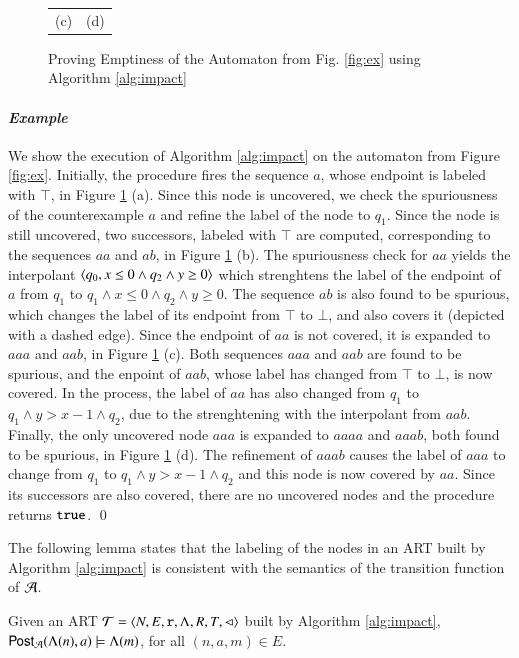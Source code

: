 \documentclass[10pt,conference,letterpaper,twocolumn]{IEEEtran}
\begin{document}
\begin{figure}[t!]
\begin{tabular}{cc}
\footnotesize{(c)} & \footnotesize{(d)}
\end{tabular}
\caption{Proving Emptiness of the Automaton from Fig. \ref{fig:ex} using Algorithm \ref{alg:impact}}
\label{fig:im}
\end{figure}

\paragraph{\em Example}
We show the execution of Algorithm \ref{alg:impact} on the automaton
from Figure \ref{fig:ex}.  Initially, the procedure fires the sequence
$a$, whose endpoint is labeled with $\top$, in Figure \ref{fig:im}
(a). Since this node is uncovered, we check the spuriousness of the
counterexample $a$ and refine the label of the node to $q_1$. Since
the node is still uncovered, two successors, labeled with $\top$ are
computed, corresponding to the sequences $aa$ and $ab$, in Figure
\ref{fig:im} (b). The spuriousness check for $aa$ yields the
interpolant $\left\langle q_0,x\leq0\wedge q_2 \wedge y\geq0 \right\rangle$ which
strenghtens the label of the endpoint of $a$ from $q_1$ to $q_1\wedge
x\leq0\wedge q_2\wedge y\geq0$. The sequence $ab$ is also found to be
spurious, which changes the label of its endpoint from $\top$ to
$\bot$, and also covers it (depicted with a dashed edge). Since the
endpoint of $aa$ is not covered, it is expanded to $aaa$ and $aab$, in
Figure \ref{fig:im} (c). Both sequences $aaa$ and $aab$ are found to
be spurious, and the enpoint of $aab$, whose label has changed from
$\top$ to $\bot$, is now covered. In the process, the label of $aa$
has also changed from $q_1$ to $q_1 \wedge y>x-1 \wedge q_2$, due to
the strenghtening with the interpolant from $aab$.  Finally, the only
uncovered node $aaa$ is expanded to $aaaa$ and $aaab$, both found to be
spurious, in Figure \ref{fig:im} (d). The refinement of $aaab$ causes
the label of $aaa$ to change from $q_1$ to $q_1 \wedge y>x-1 \wedge
q_2$ and this node is now covered by $aa$. Since its successors are
also covered, there are no uncovered nodes and the procedure returns
$\mathtt{true}$. \qed

The following lemma states that the labeling of the nodes in an ART
built by Algorithm \ref{alg:impact} is consistent with the semantics
of the transition function of $\mathcal{A}$.

\begin{lemma}\label{lemma:well-labeled}
  Given an ART $\mathcal{T} = \left\langle N,E,\mathtt{r},\Lambda,R,T,\lhd \right\rangle$ built
  by Algorithm \ref{alg:impact}, $\mathsf{Post}_{\mathcal{A}}(\Lambda(n),a) \models
  \Lambda(m)$, for all $(n,a,m) \in E$.
\end{lemma}
\end{document}
